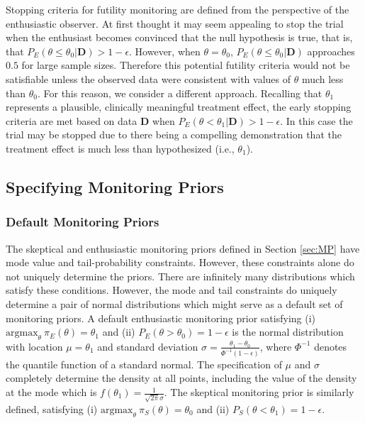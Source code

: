 \documentclass[12pt]{article}
\begin{document}
Stopping criteria for futility monitoring are defined from the perspective of the enthusiastic observer. At first thought it may seem appealing to stop the trial when the enthusiast becomes convinced that the
null hypothesis is true, that is, that $P_E(\theta\leq\theta_0|\mathbf{D})>1-\epsilon$. 
%
However, when $\theta=\theta_0$, $P_E(\theta\le\theta_0| \mathbf{D})$ approaches $0.5$ for large sample sizes. 
%
Therefore this potential futility criteria would not be satisfiable unless the observed data were consistent with values of
$\theta$ much less than $\theta_0$.
%
For this reason, we consider a different approach.
%
Recalling that $\theta_1$ represents a plausible, clinically meaningful treatment effect, the early stopping criteria are met based on data $\mathbf{D}$ when $P_E\left(\theta<\theta_1| \mathbf{D}\right)>1-\epsilon$. In this case the trial may be stopped due to there being a compelling demonstration that the treatment effect is much less than hypothesized (i.e., $\theta_1$).
%
\subsection{Specifying Monitoring Priors}\label{sec:mps}
\subsubsection{Default Monitoring Priors}\label{sec:def-mon-priors}
The skeptical and enthusiastic monitoring priors defined in Section \ref{sec:MP} have mode value and tail-probability constraints. 
%
However, these constraints alone do not uniquely determine the priors.
%
There are infinitely many distributions which satisfy these conditions.
%
However, the mode and tail constraints do uniquely determine a pair of normal distributions which might serve as a default set of monitoring priors. 
%
%
A default enthusiastic monitoring prior satisfying (i) $\text{argmax}_\theta~\pi_E(\theta)=\theta_1$
and (ii) $P_E(\theta > \theta_0)=1-\epsilon$ is the normal distribution with location $\mu=\theta_1$ and standard deviation $\sigma=\frac{\theta_1-\theta_0}{\Phi^{-1}(1-\epsilon)}$, where $\Phi^{-1}$ denotes the quantile function of a standard normal.
%
The specification of $\mu$ and $\sigma$ completely determine the density at all points, including the value of the density at the mode which is $f(\theta_1)=\frac{1}{\sqrt{2\pi}\sigma}$.
%
The skeptical monitoring prior is similarly defined, satisfying (i) $\text{argmax}_\theta~\pi_S(\theta)=\theta_0$ and (ii) $P_S(\theta < \theta_1)=1-\epsilon$.
\end{document}
